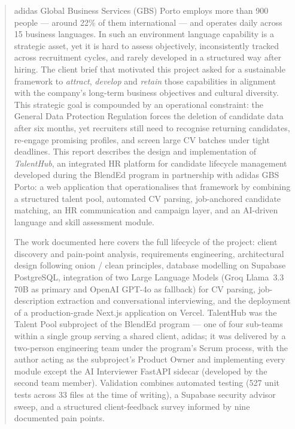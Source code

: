 \begin{abstract}

adidas Global Business Services (GBS) Porto employs more than 900 people ---
around 22\% of them international --- and operates daily across 15 business
languages. In such an environment language capability is a strategic asset,
yet it is hard to assess objectively, inconsistently tracked across
recruitment cycles, and rarely developed in a structured way after hiring.
The client brief that motivated this project asked for a sustainable framework
to \emph{attract}, \emph{develop} and \emph{retain} those capabilities in
alignment with the company's long-term business objectives and cultural
diversity. This strategic goal is compounded by an operational constraint:
the General Data Protection Regulation forces the deletion of candidate data
after six months, yet recruiters still need to recognise returning
candidates, re-engage promising profiles, and screen large CV batches under
tight deadlines. This report describes the design and implementation of
\emph{TalentHub}, an integrated HR platform for candidate lifecycle
management developed during the BlendEd program in partnership with adidas
GBS Porto: a web application that operationalises that framework by
combining a structured talent pool, automated CV parsing, job-anchored
candidate matching, an HR communication and campaign layer, and an
AI-driven language and skill assessment module.

The work documented here covers the full lifecycle of the project: client
discovery and pain-point analysis, requirements engineering, architectural
design following onion / clean principles, database modelling on Supabase
PostgreSQL, integration of two Large Language Models (Groq Llama~3.3 70B as
primary and OpenAI GPT-4o as fallback) for CV parsing, job-description
extraction and conversational interviewing, and the deployment of a
production-grade Next.js application on Vercel. TalentHub was the Talent Pool
subproject of the BlendEd program --- one of four sub-teams within a single
group serving a shared client, adidas; it was delivered by a two-person
engineering team under the program's Scrum process, with the author acting as
the subproject's Product Owner and implementing every module except the AI
Interviewer FastAPI sidecar (developed by the second team member). Validation
combines automated testing
(527 unit tests across 33 files at the time of writing), a Supabase security
advisor sweep, and a structured client-feedback survey informed by nine
documented pain points.


\end{abstract}
